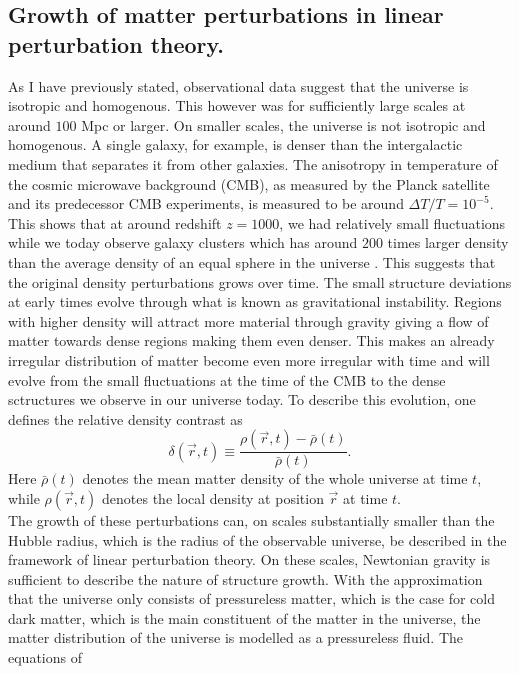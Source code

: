 \subsection{Growth of matter perturbations in linear perturbation theory.}\label{sec:linpert}
As I have previously stated, observational data suggest that the universe is isotropic and homogenous. This
however was for sufficiently large scales at around $100$ Mpc or larger. On
smaller scales, the universe is not isotropic and homogenous. A single galaxy,
for example, is denser than the intergalactic medium that separates it from other
galaxies. The anisotropy in temperature of the cosmic microwave background (CMB), as measured by
the Planck satellite and its predecessor CMB experiments, is measured to be
around $\Delta T/T=10^{-5}$. This shows that at around redshift $z=1000$, we had
relatively small fluctuations while we today observe galaxy clusters which has around
$200$ times larger density than the average density of an equal sphere in the
universe \cite[p.~342]{schneider2006extragalactic}. This suggests that the original density
perturbations grows over time. The small structure deviations at early times evolve through what is known as gravitational instability.
Regions with higher density will attract more material through gravity giving a flow of matter towards dense regions making them even denser.
This makes an already irregular distribution of matter become even more irregular with time and will evolve from the small fluctuations at the time of the CMB
to the dense sctructures we observe in our universe today.
To describe this evolution, one defines the relative density
contrast as
\begin{equation}\label{eq:overdensity}
    \delta(\vec{r}, t) \equiv \frac{\rho(\vec{r}, t) - \bar{\rho}(t)}{\bar{\rho}(t)}.
\end{equation}
Here $\bar{\rho}(t)$ denotes the mean matter density of the whole universe at
time $t$, while $\rho(\vec{r}, t)$ denotes the local density at position
$\vec{r}$ at time $t$.\\\indent
The growth of these perturbations can, on scales substantially smaller than the
Hubble radius, which is the radius of the observable universe, be described in
the framework of linear perturbation theory. On these scales, Newtonian gravity
is sufficient to describe the nature of structure growth. With the approximation
that the universe only consists of pressureless matter, which is the case for
cold dark matter, which is the main constituent of the matter in the universe, 
the matter distribution of the universe is modelled as a pressureless fluid. The equations of
